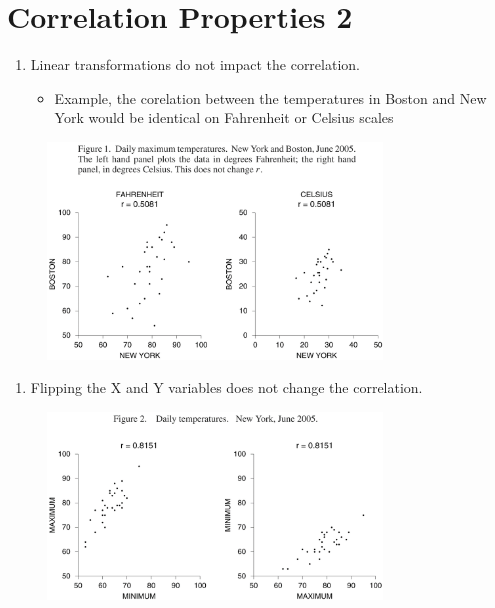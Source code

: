 \documentclass[12pt]{article}
\begin{document}
\section{Correlation Properties 2}\label{correlation-properties-2}

\begin{enumerate}
\def\labelenumi{\arabic{enumi}.}
\setcounter{enumi}{4}
\itemsep1pt\parskip0pt
\item
  Linear transformations do not impact the correlation.

  \begin{itemize}
  \itemsep1pt\parskip0pt
  \item
    Example, the corelation between the temperatures in Boston and New
    York would be identical on Fahrenheit or Celsius scales
  \end{itemize}
\end{enumerate}

\begin{figure}[H]
\centering
\includegraphics[width=3.5in]{linear_corr.png}
\caption{}
\end{figure}

\begin{enumerate}
\def\labelenumi{\arabic{enumi}.}
\setcounter{enumi}{5}
\itemsep1pt\parskip0pt
\item
  Flipping the X and Y variables does not change the correlation.
\end{enumerate}

\begin{figure}[H]
\centering
\includegraphics[width=3.5in]{flip_xy_corr.png}
\caption{}
\end{figure}
\end{document}
